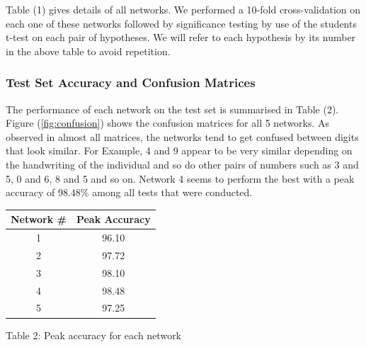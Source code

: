 \documentclass[10pt,twocolumn,letterpaper]{article}
\begin{document}
Table (1) gives details of all networks. We performed a 10-fold cross-validation on each one of these networks followed by significance testing by use of the students t-test on each pair of hypotheses. We will refer to each hypothesis by its number in the above table to avoid repetition.

\subsubsection{Test Set Accuracy and Confusion Matrices}
The performance of each network on the test set is summarised in Table (2). Figure (\ref{fig:confusion}) shows the confusion matrices for all 5 networks. As observed in almost all matrices, the networks tend to get confused between digits that look similar. For Example, 4 and 9 appear to be very similar depending on the handwriting of the individual and so do other pairs of numbers such as 3 and 5, 0 and 6, 8 and 5 and so on. Network 4 seems to perform the best with a peak accuracy of 98.48\% among all tests that were conducted.
\begin{center}
\begin{tabular}{|c|c|}
	\hline
	\textbf{Network \#} & \textbf{Peak Accuracy} \\ \hline \hline
	1 & 96.10\\ \hline
	2 & 97.72\\ \hline
	3 & 98.10\\ \hline
	4 & 98.48\\ \hline
	5 & 97.25\\ \hline
\end{tabular}
\end{center}
\begin{center}
	Table 2: Peak accuracy for each network
\end{center}
\end{document}
